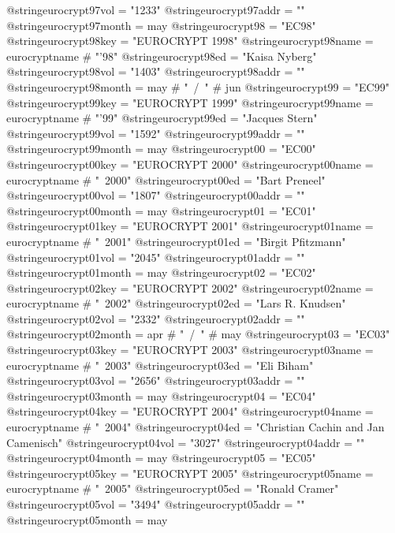 @string{eurocrypt97vol =        "1233"}
@string{eurocrypt97addr =       ""}
@string{eurocrypt97month =      may}
@string{eurocrypt98 =           "EC98"}
@string{eurocrypt98key =        "EUROCRYPT 1998"}
@string{eurocrypt98name =       eurocryptname # "'98"}
@string{eurocrypt98ed =         "Kaisa Nyberg"}
@string{eurocrypt98vol =        "1403"}
@string{eurocrypt98addr =       ""}
@string{eurocrypt98month =      may # "~/~" # jun}
@string{eurocrypt99 =           "EC99"}
@string{eurocrypt99key =        "EUROCRYPT 1999"}
@string{eurocrypt99name =       eurocryptname # "'99"}
@string{eurocrypt99ed =         "Jacques Stern"}
@string{eurocrypt99vol =        "1592"}
@string{eurocrypt99addr =       ""}
@string{eurocrypt99month =      may}
@string{eurocrypt00 =           "EC00"}
@string{eurocrypt00key =        "EUROCRYPT 2000"}
@string{eurocrypt00name =       eurocryptname # "~2000"}
@string{eurocrypt00ed =         "Bart Preneel"}
@string{eurocrypt00vol =        "1807"}
@string{eurocrypt00addr =       ""}
@string{eurocrypt00month =      may}
@string{eurocrypt01 =           "EC01"}
@string{eurocrypt01key =        "EUROCRYPT 2001"}
@string{eurocrypt01name =       eurocryptname # "~2001"}
@string{eurocrypt01ed =         "Birgit Pfitzmann"}
@string{eurocrypt01vol =        "2045"}
@string{eurocrypt01addr =       ""}
@string{eurocrypt01month =      may}
@string{eurocrypt02 =           "EC02"}
@string{eurocrypt02key =        "EUROCRYPT 2002"}
@string{eurocrypt02name =       eurocryptname # "~2002"}
@string{eurocrypt02ed =         "Lars R. Knudsen"}
@string{eurocrypt02vol =        "2332"}
@string{eurocrypt02addr =       ""}
@string{eurocrypt02month =      apr # "~/~" # may}
@string{eurocrypt03 =           "EC03"}
@string{eurocrypt03key =        "EUROCRYPT 2003"}
@string{eurocrypt03name =       eurocryptname # "~2003"}
@string{eurocrypt03ed =         "Eli Biham"}
@string{eurocrypt03vol =        "2656"}
@string{eurocrypt03addr =       ""}
@string{eurocrypt03month =      may}
@string{eurocrypt04 =           "EC04"}
@string{eurocrypt04key =        "EUROCRYPT 2004"}
@string{eurocrypt04name =       eurocryptname # "~2004"}
@string{eurocrypt04ed =         "Christian Cachin and Jan Camenisch"}
@string{eurocrypt04vol =        "3027"}
@string{eurocrypt04addr =       ""}
@string{eurocrypt04month =      may}
@string{eurocrypt05 =           "EC05"}
@string{eurocrypt05key =        "EUROCRYPT 2005"}
@string{eurocrypt05name =       eurocryptname # "~2005"}
@string{eurocrypt05ed =         "Ronald Cramer"}
@string{eurocrypt05vol =        "3494"}
@string{eurocrypt05addr =       ""}
@string{eurocrypt05month =      may}
